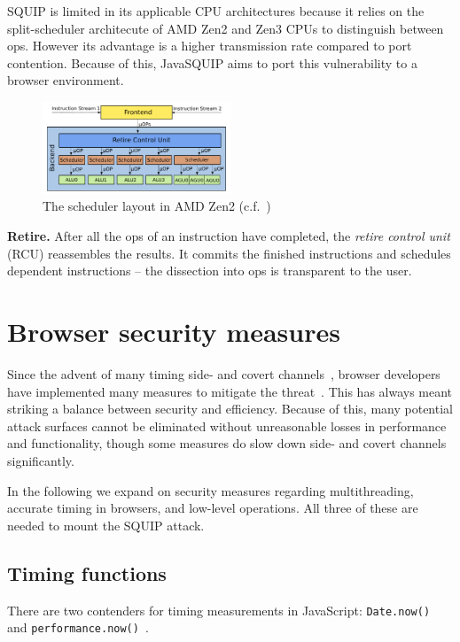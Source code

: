 \documentclass[11pt,
  titlepage=false,
]{scrreprt}
\begin{document}
\clearpage
SQUIP is limited in its applicable CPU architectures because it relies on the split-scheduler architecute of AMD Zen2 and Zen3 CPUs to distinguish between \textmu ops.
However its advantage is a higher transmission rate compared to port contention.
Because of this, JavaSQUIP aims to port this vulnerability to a browser environment.

\begin{figure}
    \centering
    \includegraphics[width=0.5\textwidth]{figures/Zen2 arch}

    \caption{The scheduler layout in AMD Zen2 (c.f.~\cite{AMD2017OptimizationEPYC7001})}
    \label{fig:amdzen2}
\end{figure}

\textbf{Retire.}
After all the \textmu ops of an instruction have completed, the \textit{retire control unit} (RCU) reassembles the results.
It commits the finished instructions and schedules dependent instructions -- the dissection into \textmu ops is transparent to the user.


\section{Browser security measures}
\label{sec:browsersecurity}
Since the advent of many timing side- and covert channels~\cite{noack2018exploiting, Rokicki2022webport, gruss2016rowhammer},
browser developers have implemented many measures to mitigate the threat~\cite{shusterman2021prime, performancenow, performancenowchrome}.
This has always meant striking a balance between security and efficiency.
Because of this, many potential attack surfaces cannot be eliminated without unreasonable losses in performance and functionality,
though some measures do slow down side- and covert channels significantly.

In the following we expand on security measures regarding multithreading, accurate timing in browsers, and low-level operations.
All three of these are needed to mount the SQUIP attack.


\subsection{Timing functions}\label{subsec:timingjs}
There are two contenders for timing measurements in JavaScript: \texttt{Date.now()}~\cite{datenow} and \texttt{performance.now()}~\cite{performancenow}.
\end{document}
